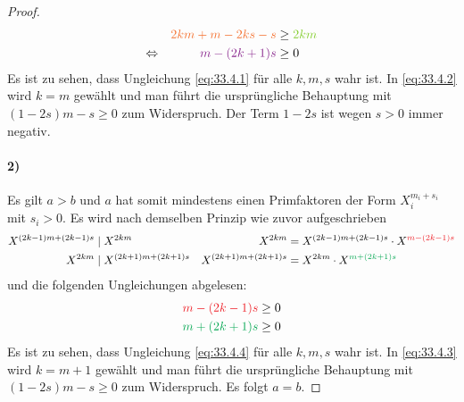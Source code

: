 \begin{proof}
\begin{equation}
  \end{equation}
  \begin{equation}
    \label{eq:33.4.2}
    \begin{aligned}
                      &  & \textcolor{Orange}{2km + m - 2ks - s} & \geq \textcolor{LimeGreen}{2km} \\
      \Leftrightarrow &  & \textcolor{Fuchsia}{m - (2k + 1)s}    & \geq 0                          \\
    \end{aligned}
  \end{equation}
  \noindent
  Es ist zu sehen, dass Ungleichung \ref{eq:33.4.1} für alle $k,m,s$ wahr ist. In \ref{eq:33.4.2}
  wird $k = m$ gewählt und man führt die ursprüngliche Behauptung mit
  $(1 - 2s)m -s \geq 0$ zum Widerspruch. Der Term $1 - 2s$ ist wegen $s > 0$ immer negativ.

  \paragraph{2)}
  Es gilt $a > b$ und $a$ hat somit mindestens einen Primfaktoren
  der Form $X_i^{m_i + s_i}$ mit $s_i > 0$. Es wird nach demselben Prinzip wie zuvor aufgeschrieben
  \begin{align*}
    X^{(2k - 1)m + (2k -1)s}  & \mid X^{2km}                                         &
    X^{2km}                   & = X^{(2k - 1)m + (2k -1)s}
    \cdot X^{\textcolor{Red}{m - (2k - 1)s}}                                           \\
    X^{2km}                   & \mid X^{(2k + 1)m + (2k + 1)s}                       &
    X^{(2k + 1)m + (2k + 1)s} & = X^{2km} \cdot X^{\textcolor{Green}{m + (2k + 1)s}}
  \end{align*}
  und die folgenden Ungleichungen abgelesen:
  \begin{align}
    \label{eq:33.4.3}
    \textcolor{Red}{m - (2k - 1)s}   & \geq 0 \\
    \label{eq:33.4.4}
    \textcolor{Green}{m + (2k + 1)s} & \geq 0
  \end{align}
  Es ist zu sehen, dass Ungleichung \ref{eq:33.4.4} für alle $k,m,s$ wahr ist. In \ref{eq:33.4.3}
  wird $k = m + 1$ gewählt und man führt die ursprüngliche Behauptung
  mit $(1 - 2s)m - s \geq 0$ zum Widerspruch.\bignewline
  Es folgt $a = b$.
\end{proof}